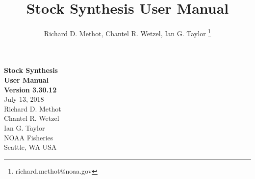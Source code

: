 \documentclass[12pt]{article}
\title{\textcolor[cmyk]{1.00,0.83,0.41,0.36}{Stock Synthesis User Manual }}
\author{Richard D. Methot, Chantel R. Wetzel, Ian G. Taylor \footnote{richard.methot@noaa.gov}}
\begin{document}
	\begin{titlepage}
			\begin{center}
				\huge{\bfseries Stock Synthesis}\\
				\huge{\bfseries User Manual}\\		
				[0.50in]
				\huge{\bfseries Version 3.30.12}\\
				[1in]
				\LARGE{July 13, 2018}\\
				[1in]
				\LARGE{Richard D. Methot}\\
			    \LARGE{Chantel R. Wetzel}\\
			    \LARGE{Ian G. Taylor}\\
			    [1in]
				NOAA Fisheries\\
				Seattle, WA USA\\		
			\end{center}
		\end{titlepage}
	
		
		\tableofcontents
		\thispagestyle{empty}
		\cleardoublepage
		\setcounter{secnumdepth}{0}
		\newpage
		
		\renewcommand{\headrulewidth}{0pt} %
		\cleardoublepage

		
		
		
		
		
		
		
		
			
			
			
		
			
			
			
			
			
		
				
\end{document}
